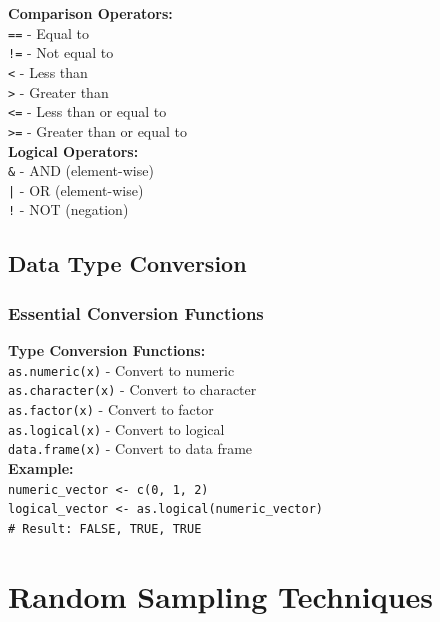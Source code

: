 \documentclass[11pt,a4paper]{article}
\begin{document}
\begin{formulabox}
\textbf{Comparison Operators:}\\
\texttt{==} - Equal to\\
\texttt{!=} - Not equal to\\
\texttt{<} - Less than\\
\texttt{>} - Greater than\\
\texttt{<=} - Less than or equal to\\
\texttt{>=} - Greater than or equal to\\[0.3cm]
\textbf{Logical Operators:}\\
\texttt{\&} - AND (element-wise)\\
\texttt{|} - OR (element-wise)\\
\texttt{!} - NOT (negation)
\end{formulabox}

\subsection{Data Type Conversion}

\subsubsection{Essential Conversion Functions}

\begin{formulabox}
\textbf{Type Conversion Functions:}\\
\texttt{as.numeric(x)} - Convert to numeric\\
\texttt{as.character(x)} - Convert to character\\
\texttt{as.factor(x)} - Convert to factor\\
\texttt{as.logical(x)} - Convert to logical\\
\texttt{data.frame(x)} - Convert to data frame\\[0.3cm]
\textbf{Example:}\\
\texttt{numeric\_vector <- c(0, 1, 2)}\\
\texttt{logical\_vector <- as.logical(numeric\_vector)}\\
\texttt{\# Result: FALSE, TRUE, TRUE}
\end{formulabox}

\section{Random Sampling Techniques}
\end{document}
